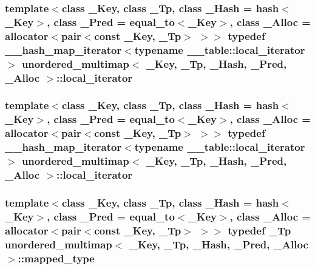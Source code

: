 \subsubsection[{local\+\_\+iterator}]{\setlength{\rightskip}{0pt plus 5cm}template$<$class \+\_\+\+Key, class \+\_\+\+Tp, class \+\_\+\+Hash = hash$<$\+\_\+\+Key$>$, class \+\_\+\+Pred = equal\+\_\+to$<$\+\_\+\+Key$>$, class \+\_\+\+Alloc = allocator$<$pair$<$const \+\_\+\+Key, \+\_\+\+Tp$>$ $>$$>$ typedef {\bf \+\_\+\+\_\+hash\+\_\+map\+\_\+iterator}$<$typename \+\_\+\+\_\+table\+::local\+\_\+iterator$>$ {\bf unordered\+\_\+multimap}$<$ \+\_\+\+Key, \+\_\+\+Tp, \+\_\+\+Hash, \+\_\+\+Pred, \+\_\+\+Alloc $>$\+::{\bf local\+\_\+iterator}}\label{classunordered__multimap_a672fd63d94f807d130e2026d2863d40c}
\hypertarget{classunordered__multimap_a672fd63d94f807d130e2026d2863d40c}{}
\subsubsection[{local\+\_\+iterator}]{\setlength{\rightskip}{0pt plus 5cm}template$<$class \+\_\+\+Key, class \+\_\+\+Tp, class \+\_\+\+Hash = hash$<$\+\_\+\+Key$>$, class \+\_\+\+Pred = equal\+\_\+to$<$\+\_\+\+Key$>$, class \+\_\+\+Alloc = allocator$<$pair$<$const \+\_\+\+Key, \+\_\+\+Tp$>$ $>$$>$ typedef {\bf \+\_\+\+\_\+hash\+\_\+map\+\_\+iterator}$<$typename \+\_\+\+\_\+table\+::local\+\_\+iterator$>$ {\bf unordered\+\_\+multimap}$<$ \+\_\+\+Key, \+\_\+\+Tp, \+\_\+\+Hash, \+\_\+\+Pred, \+\_\+\+Alloc $>$\+::{\bf local\+\_\+iterator}}\label{classunordered__multimap_a672fd63d94f807d130e2026d2863d40c}
\hypertarget{classunordered__multimap_a50bc9bc504d96ff3c7ca7db1f428eb5e}{}
\subsubsection[{mapped\+\_\+type}]{\setlength{\rightskip}{0pt plus 5cm}template$<$class \+\_\+\+Key, class \+\_\+\+Tp, class \+\_\+\+Hash = hash$<$\+\_\+\+Key$>$, class \+\_\+\+Pred = equal\+\_\+to$<$\+\_\+\+Key$>$, class \+\_\+\+Alloc = allocator$<$pair$<$const \+\_\+\+Key, \+\_\+\+Tp$>$ $>$$>$ typedef \+\_\+\+Tp {\bf unordered\+\_\+multimap}$<$ \+\_\+\+Key, \+\_\+\+Tp, \+\_\+\+Hash, \+\_\+\+Pred, \+\_\+\+Alloc $>$\+::{\bf mapped\+\_\+type}}\label{classunordered__multimap_a50bc9bc504d96ff3c7ca7db1f428eb5e}
\hypertarget{classunordered__multimap_a50bc9bc504d96ff3c7ca7db1f428eb5e}{}
